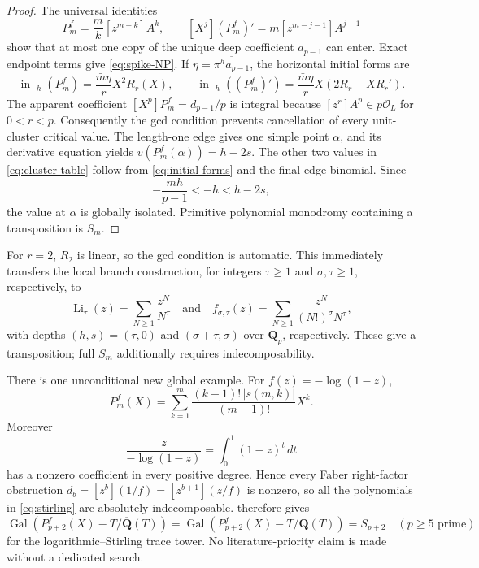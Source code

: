 \documentclass[11pt]{article}
\theoremstyle{keio}
\theoremstyle{keioinput}
\newcommand{\Q}{\mathbf{Q}}
\newcommand{\Gal}{\operatorname{Gal}}
\begin{document}
\begin{proof}
The universal identities
\begin{equation}
[X^k]P_m^f=\frac mk[z^{m-k}]A^k,
\qquad
[X^j](P_m^f)'=m[z^{m-j-1}]A^{j+1}
\label{eq:faber-universal}
\end{equation}
show that at most one copy of the unique deep coefficient $a_{p-1}$ can
enter. Exact endpoint terms give \eqref{eq:spike-NP}. If
$\eta=\overline{\pi^ha_{p-1}}$, the horizontal initial forms are
\begin{equation}
\operatorname{in}_{-h}(P_m^f)
=\frac{\bar m\eta}{r}X^2R_r(X),
\qquad
\operatorname{in}_{-h}((P_m^f)')
=\frac{\bar m\eta}{r}X(2R_r+XR_r').
\label{eq:initial-forms}
\end{equation}
The apparent coefficient $[X^p]P_m^f=d_{p-1}/p$ is integral because
$[z^r]A^p\in p\mathcal O_L$ for $0<r<p$. Consequently the gcd condition
prevents cancellation of every unit-cluster critical value. The length-one
edge gives one simple point $\alpha$, and its derivative equation yields
$v(P_m^f(\alpha))=h-2s$. The other two values in
\eqref{eq:cluster-table} follow from \eqref{eq:initial-forms} and the
final-edge binomial. Since
\[
-\frac{mh}{p-1}<-h<h-2s,
\]
the value at $\alpha$ is globally isolated. Primitive polynomial monodromy
containing a transposition is $S_m$.
\end{proof}

For $r=2$, $R_2$ is linear, so the gcd condition is automatic. This
immediately transfers the local branch construction, for integers
$\tau\ge1$ and $\sigma,\tau\ge1$, respectively, to
\begin{equation}
\operatorname{Li}_\tau(z)=\sum_{N\ge1}\frac{z^N}{N^\tau}
\quad\text{and}\quad
f_{\sigma,\tau}(z)=\sum_{N\ge1}\frac{z^N}{(N!)^\sigma N^\tau},
\label{eq:transfer-families}
\end{equation}
with depths $(h,s)=(\tau,0)$ and $(\sigma+\tau,\sigma)$ over $\Q_p$,
respectively. These give a transposition; full $S_m$ additionally requires
indecomposability.

There is one unconditional new global example. For
$f(z)=-\log(1-z)$,
\begin{equation}
P_m^f(X)=\sum_{k=1}^m
\frac{(k-1)!\,|s(m,k)|}{(m-1)!}X^k.
\label{eq:stirling}
\end{equation}
Moreover
\[
\frac z{-\log(1-z)}=\int_0^1(1-z)^t\,dt
\]
has a nonzero coefficient in every positive degree. Hence every Faber
right-factor obstruction $d_b=[z^b](1/f)=[z^{b+1}](z/f)$ is nonzero, so
all the polynomials in \eqref{eq:stirling} are absolutely indecomposable.
 therefore gives
\begin{equation}
\boxed{
\Gal(P_{p+2}^f(X)-T/\overline{\Q}(T))
=\Gal(P_{p+2}^f(X)-T/\Q(T))=S_{p+2}
\quad(p\ge5\text{ prime})}
\label{eq:stirling-mon}
\end{equation}
for the logarithmic--Stirling trace tower. No literature-priority claim is
made without a dedicated search.
\end{document}
